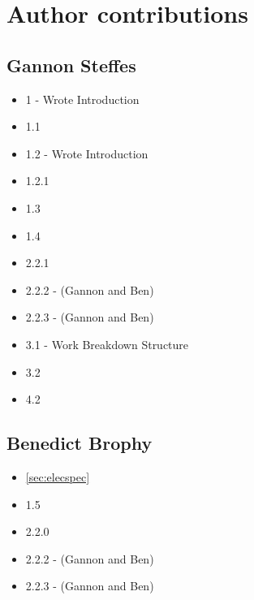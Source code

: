 \documentclass[10pt]{project}
\begin{document}
\section{Author contributions}

\subsection{Gannon Steffes}

\begin{itemize}
    \item 1 - Wrote Introduction
    \item 1.1
    \item 1.2 - Wrote Introduction
    \item 1.2.1
    \item 1.3
    \item 1.4
    \item 2.2.1
    \item 2.2.2 - (Gannon and Ben)
    \item 2.2.3 - (Gannon and Ben)
    \item 3.1 - Work Breakdown Structure
    \item 3.2
    \item 4.2
\end{itemize}


\subsection{Benedict Brophy}
\begin{itemize}
    \item \ref{sec:elecspec}
    \item 1.5
    \item 2.2.0  
    \item 2.2.2 - (Gannon and Ben)
    \item 2.2.3 - (Gannon and Ben)
\end{itemize}
\end{document}
